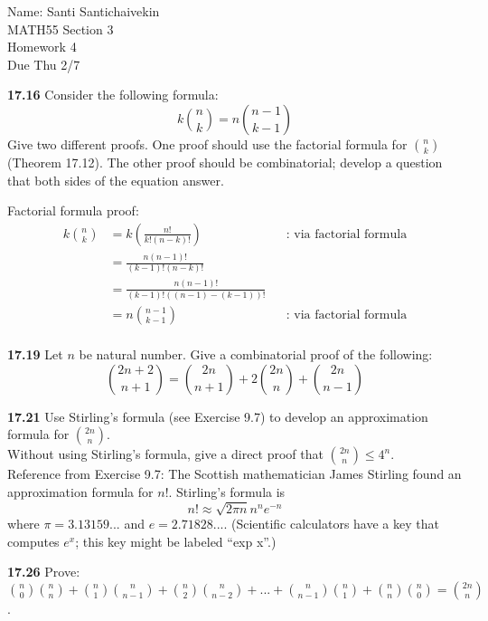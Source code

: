 \documentclass[10pt]{article}
\begin{document}
\begin{flushright}
	Name: Santi Santichaivekin \\
	MATH55 Section 3 \\
	Homework 4 \\
	Due Thu 2/7
\end{flushright}

\begin{framed}
    \textbf{17.16} Consider the following formula:
    $$
    k \binom{n}{k} = n\binom{n-1}{k-1}
    $$
    Give two different proofs. One proof should use the factorial formula for $\binom{n}{k}$ 
    (Theorem 17.12). The other proof should be combinatorial; develop a question that both sides of
    the equation answer.
\end{framed}

Factorial formula proof:
\begin{align*}
    k\binom{n}{k} &= k(\frac{n!}{k!(n-k)!})  && \text{: via factorial formula}\\
                  &= \frac{n(n-1)!}{(k-1)!(n-k)!}\\
                  &= \frac{n(n-1)!}{(k-1)!((n-1)-(k-1))!}\\
                  &= n\binom{n-1}{k-1} &&\text{: via factorial formula}\\ 
\end{align*}

\pagebreak

\begin{framed}
    \textbf{17.19} Let $n$ be natural number. Give a combinatorial proof of the following:
    $$
    \binom{2n+2}{n+1} = \binom{2n}{n+1} + 2\binom{2n}{n} + \binom{2n}{n-1}
    $$
\end{framed}

\pagebreak

\begin{framed}
    \textbf{17.21} Use Stirling's formula (see Exercise 9.7) to develop an approximation formula for 
    $\binom{2n}{n}$.\\
    Without using Stirling's formula, give a direct proof that $\binom{2n}{n} \leq 4^n$.\\

    Reference from Exercise 9.7: The Scottish mathematician James Stirling found an approximation formula for $n!$.
    Stirling’s formula is
    $$
        n! \approx \sqrt{2\pi n} n^n e^{-n}
    $$
    where $\pi = 3.13159...$ and $e = 2.71828...$. (Scientific calculators have a key that computes $e^x$;
    this key might be labeled ``exp x''.)
\end{framed}

\pagebreak

\begin{framed}
    \textbf{17.26} Prove: $\binom{n}{0}\binom{n}{n} + \binom{n}{1}\binom{n}{n-1} +
    \binom{n}{2}\binom{n}{n-2} + ... + \binom{n}{n-1}\binom{n}{1} + \binom{n}{n}\binom{n}{0} = \binom{2n}{n}$.
\end{framed}
\end{document}
